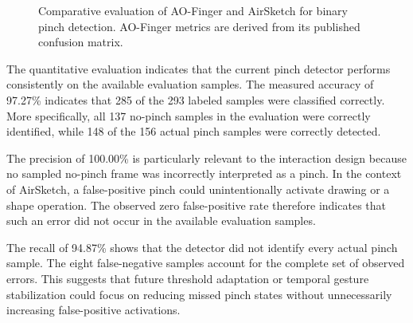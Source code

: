 \documentclass[conference]{IEEEtran}
\begin{document}
\begin{figure}[H]
\centering
{}
\caption{Comparative evaluation of AO-Finger and AirSketch
for binary pinch detection. AO-Finger metrics are derived
from its published confusion matrix.}
\label{fig:metrics}
\end{figure}


The quantitative evaluation indicates that the current pinch detector performs consistently on the available evaluation samples. The measured accuracy of 97.27\% indicates that 285 of the 293 labeled samples were classified correctly. More specifically, all 137 no-pinch samples in the evaluation were correctly identified, while 148 of the 156 actual pinch samples were correctly detected.

The precision of 100.00\% is particularly relevant to the interaction design because no sampled no-pinch frame was incorrectly interpreted as a pinch. In the context of AirSketch, a false-positive pinch could unintentionally activate drawing or a shape operation. The observed zero false-positive rate therefore indicates that such an error did not occur in the available evaluation samples.

The recall of 94.87\% shows that the detector did not identify every actual pinch sample. The eight false-negative samples account for the complete set of observed errors. This suggests that future threshold adaptation or temporal gesture stabilization could focus on reducing missed pinch states without unnecessarily increasing false-positive activations.
\end{document}
